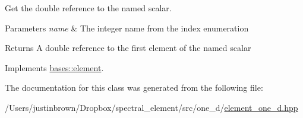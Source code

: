 Get the double reference to the named scalar. 



 
\begin{DoxyParams}{Parameters}
{\em name} & The integer name from the index enumeration\\
\hline
\end{DoxyParams}
\begin{DoxyReturn}{Returns}
A double reference to the first element of the named scalar 
\end{DoxyReturn}


Implements \hyperlink{classbases_1_1element_a4ae6c42893603fc086c5c207e236f9d8}{bases\-::element}.



The documentation for this class was generated from the following file\-:\begin{DoxyCompactItemize}
\item 
/\-Users/justinbrown/\-Dropbox/spectral\-\_\-element/src/one\-\_\-d/\hyperlink{element__one__d_8hpp}{element\-\_\-one\-\_\-d.\-hpp}\end{DoxyCompactItemize}
